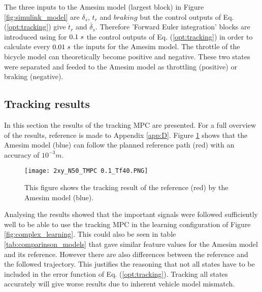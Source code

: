 The three inputs to the Amesim model (largest block)  in Figure \ref{fig:simulink_model} are $\delta_s$, $t_r$ and $braking$ but the control outputs of Eq. (\ref{opt:tracking}) give $\dot{t}_r$ and $\dot{\delta_s}$. Therefore 'Forward Euler integration' blocks are introduced using for $0.1\hspace{1mm}s$ the control outputs of Eq. (\ref{opt:tracking}) in order to calculate every $0.01\hspace{1mm}s$ the inputs for the Amesim model. The throttle of the bicycle model can theoretically become positive and negative. These two states were separated and feeded to the Amesim model as throttling (positive) or braking (negative). 


\subsection{Tracking results} 
\label{s:tracking_results}

In this section the results of the tracking MPC are presented. For a full overview of the results, reference is made to Appendix \ref{app:D}. Figure \ref{fig:xy_mpc} shows that the Amesim model (blue) can follow the planned reference path (red) with an accuracy of $10^{-3}m$. 

\begin{figure}[h!]
	\centering
	\texttt{[image: 2xy\_N50\_TMPC 0.1\_Tf40.PNG]}
	\caption{This figure shows the tracking result of the reference (red) by the Amesim model (blue).}	
	\label{fig:xy_mpc}
\end{figure}

Analysing the results showed that the important signals were followed sufficiently well to be able to use the tracking MPC in the learning configuration of Figure \ref{fig:complex_learning}. This could also be seen in table \ref{tab:comparinson_models} that gave similar feature values for the Amesim model and its reference. However there are also differences between the reference and the followed trajectory. This justifies the reasoning that not all states have to be included in the error function of Eq. (\ref{opt:tracking}). Tracking all states accurately will give worse results due to inherent vehicle model mismatch.\\ 

